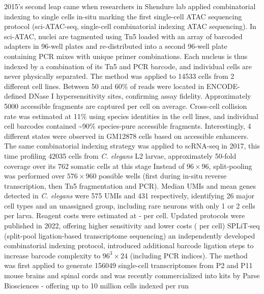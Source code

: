 

2015's second leap came when researchers in Shendure lab applied combinatorial indexing to single cells in-situ marking the first single-cell ATAC sequencing protocol (sci-ATAC-seq, single-cell combinatorial indexing ATAC sequencing). In sci-ATAC, nuclei are tagmented using Tn5 loaded with an array of barcoded adapters in 96-well plates and re-distributed into a second 96-well plate containing PCR mixes with unique primer combinations. Each nucleus is thus indexed by a combination of its Tn5 and PCR barcode, and individual cells are never physically separated. The method was applied to \num{14533} cells from 2 different cell lines. Between 50 and 60\% of reads were located in ENCODE-defined DNase I hypersensitivity sites, confirming assay fidelity. Approximately \num{5000} accessible fragments are captured per cell on average. Cross-cell collision rate was estimated at 11\% using species identities in the cell lines, and individual cell barcodes contained \textasciitilde90\% species-pure accessible fragments. Interestingly, 4 different states were observed in GM12878 cells based on accessible enhancers. The same combinatorial indexing strategy was applied to scRNA-seq in 2017, this time profiling \num{42035} cells from \textit{C. elegans} L2 larvae, approximately 50-fold coverage over its 762 somatic cells at this stage Instead of $96 \times 96$, split-pooling was performed over $576 \times 960$ possible wells (first during in-situ reverse transcription, then Tn5 fragmentation and PCR). Median UMIs and mean genes detected in \textit{C. elegans} were 575 UMIs and 431 respectively, identifying 26 major cell types and an unassigned group, including rare neurons with only 1 or 2 cells per larva. Reagent costs were estimated at - per cell. Updated protocols were published in 2022, offering higher sensitivity and lower costs ( per cell) SPLiT-seq (split-pool ligation-based transcriptome sequencing) an independently developed combinatorial indexing protocol, introduced additional barcode ligation steps to increase barcode complexity to $96^3 \times 24$ (including PCR indices). The method was first applied to generate \num{156049} single-cell transcriptomes from P2 and P11 mouse brains and spinal cords and was recently commercialized into kits by Parse Biosciences - offering up to 10 million cells indexed per run

